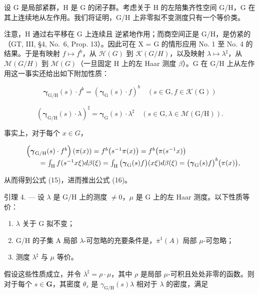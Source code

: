 设 G 是局部紧群，H 是 G 的闭子群。考虑关于 H 的左陪集齐性空间 G/H，G 在其上连续地从左作用。我们将证明，G/H 上非零拟不变测度只有一个等价类。

注意，H 通过右平移在 G 上连续且 逆紧地作用；而商空间正是 G/H，是仿紧的（GT, III, §4, No.~6, Prop. 13）。因此可在 X = G 的情形应用 No. 1 至 No. 4 的结果。于是有映射 \(f \mapsto f^{b}\)，从 \(\mathcal{H}(G)\) 到 \(\mathcal{K}(G/H)\)，以及映射 \(\lambda \mapsto \lambda^{\sharp}\)，从 \(\mathcal{M}(G/H)\) 到 \(\mathcal{M}(G)\)（一旦固定 H 上的左 Haar 测度 \(\beta\)）。G 在 G/H 上从左作用这一事实还给出如下附加性质：

\[
\boldsymbol {\gamma} _ {\mathrm{G/H}} (s) \cdot f ^ {b} = \left(\boldsymbol {\gamma} _ {\mathrm{G}} (s) \cdot f\right) ^ {b} \quad \left(s \in \mathrm{G}, f \in \mathscr {K} (\mathrm{G})\right)\tag{15}
\]

\[
\left(\boldsymbol {\gamma} _ {\mathrm{G/H}} (s) \cdot \lambda\right) ^ {\sharp} = \boldsymbol {\gamma} _ {\mathrm{G}} (s) \cdot \lambda^ {\sharp} \quad \left(s \in \mathrm{G}, \lambda \in \mathscr {M} (\mathrm{G/H})\right).\tag{16}
\]

事实上，对于每个 \(x \in G\)，

\[
\begin{array}{r l} & {\left(\boldsymbol {\gamma} _ {\mathrm{G/H}} (s) \cdot f ^ {b}\right) (\pi (x)) = f ^ {b} \big (s ^ {- 1} \pi (x) \big) = f ^ {b} \big (\pi (s ^ {- 1} x) \big)} \\ & {\qquad = \int_ {\mathrm{H}} f (s ^ {- 1} x \xi) d \beta (\xi) = \int_ {\mathrm{H}} \big (\boldsymbol {\gamma} _ {\mathrm{G}} (s) f \big) (x \xi) d \beta (\xi) = \big (\boldsymbol {\gamma} _ {\mathrm{G}} (s) f \big) ^ {b} \big (\pi (x) \big),} \end{array}
\]

从而得到公式 (15)，进而推出公式 (16)。

引理 4. --- 设 \(\lambda\) 是 G/H 上的测度 \(\neq 0\)，\(\mu\) 是 G 上的左 Haar 测度。以下性质等价：

\begin{enumerate}
\def\labelenumi{\alph{enumi})}
\item
  \(\lambda\) 关于 G 拟不变；
\item
  G/H 的子集 A 局部 \(\lambda\)-可忽略的充要条件是，\(\overline{\pi}^{1}(A)\) 局部 \(\mu\)-可忽略；
\item
  测度 \(\lambda^{\sharp}\) 与 \(\mu\) 等价。
\end{enumerate}

假设这些性质成立，并令 \(\lambda^{\sharp} = \rho \cdot \mu\)，其中 \(\rho\) 是局部 \(\mu\)-可积且处处非零的函数。则对于每个 \(s \in \mathbf{G}\)，其密度 \(\theta_s\) 是 \(\gamma_{\mathrm{G / H}}(s)\lambda\) 相对于 \(\lambda\) 的密度，满足

